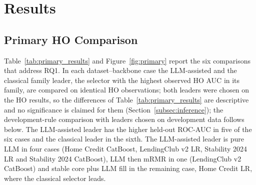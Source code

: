 \documentclass[final,5p,twocolumn]{elsarticle}
\begin{document}

\section{Results}
\label{sec:results}

\subsection{Primary HO Comparison}
\label{subsec:primary_results}

Table~\ref{tab:primary_results} and Figure~\ref{fig:primary} report the six comparisons that address RQ1. In each dataset--backbone case the LLM-assisted and the classical family leader, the selector with the highest observed HO AUC in its family, are compared on identical HO observations; both leaders were chosen on the HO results, so the differences of Table~\ref{tab:primary_results} are descriptive and no significance is claimed for them (Section~\ref{subsec:inference}); the development-rule comparison with leaders chosen on development data follows below. The LLM-assisted leader has the higher held-out ROC-AUC in five of the six cases and the classical leader in the sixth. The LLM-assisted leader is pure LLM in four cases (Home Credit CatBoost, LendingClub v2 LR, Stability 2024 LR and Stability 2024 CatBoost), LLM then mRMR in one (LendingClub v2 CatBoost) and stable core plus LLM fill in the remaining case, Home Credit LR, where the classical selector leads.
\end{document}
